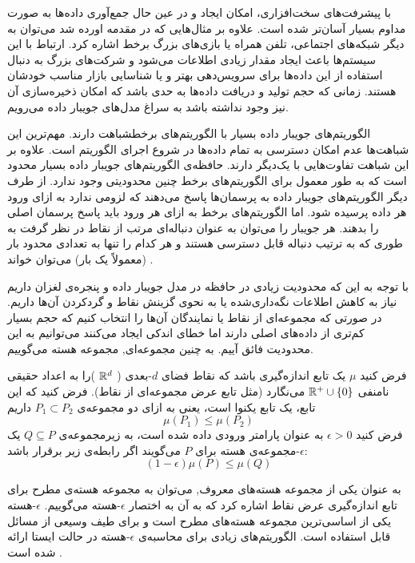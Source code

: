 با پیشرفت‌های سخت‌افزاری، امکان ایجاد و در عین حال جمع‌آوری داده‌ها به صورت مداوم بسیار آسان‌تر شده است. علاوه بر مثال‌هایی که در مقدمه اورده شد می‌توان به دیگر شبکه‌های اجتماعی، تلفن همراه یا بازی‌های بزرگ برخط اشاره کرد. ارتباط با این سیستم‌ها باعث ایجاد مقدار زیادی اطلاعات می‌شود و شرکت‌های بزرگ به دنبال استفاده از این داده‌ها برای سرویس‌دهی بهتر و یا شناسایی بازار مناسب خودشان هستند. زمانی که حجم تولید و دریافت داده‌ها به حدی باشد که امکان ذخیره‌سازی آن نیز وجود نداشته باشد به سراغ مدل‌های جویبار داده می‌رویم.

الگوریتم‌های جویبار داده بسیار با الگوریتم‌های برخطشباهت دارند. مهم‌ترین این شباهت‌ها عدم امکان دسترسی به تمام داده‌ها در شروع اجرای الگوریتم است. علاوه بر این شباهت تفاوت‌هایی با یک‌دیگر دارند. حافظه‌ی الگوریتم‌های جویبار داده بسیار محدود است که به طور معمول برای الگوریتم‌های برخط چنین محدودیتی وجود ندارد. از طرف دیگر الگوریتم‌های جویبار داده به پرسمان‌ها پاسخ می‌دهند که لزومی ندارد به ازای ورود هر داده پرسیده شود. اما الگوریتم‌های برخط به ازای هر ورود باید پاسخ پرسمان اصلی را بدهند.
هر جویبار را می‌توان به عنوان دنباله‌ای مرتب از نقاط در نظر گرفت به طوری که به ترتیب دنباله قابل دسترسی هستند و هر کدام را تنها به تعدادی محدود بار (معمولاً یک بار) می‌توان خواند .

با توجه به این که محدودیت زیادی در حافظه در مدل جویبار داده و پنجره‌ی لغزان داریم نیاز به کاهش اطلاعات نگه‌داری‌شده یا به نحوی گزینش نقاط و گردکردن آن‌ها داریم.
در صورتی که مجموعه‌ای از نقاط یا نمایندگان آن‌ها را انتخاب کنیم که حجم بسیار کم‌تری از داده‌های اصلی دارند اما خطای اندکی ایجاد می‌کنند می‌توانیم به این محدودیت فائق آییم. به چنین مجموعه‌ای, مجموعه هسته می‌گوییم.


فرض کنید $\mu$ یک تابع اندازه‌گیری باشد که نقاط فضای $d$-بعدی ‌( $\mathbb{R}^d$ )را به اعداد حقیقی نامنفی $\mathbb{R}^+ \cup \left\{ 0 \right\}$ می‌نگارد (مثل تابع عرض مجموعه‌ای از نقاط). 
فرض کنید که این تابع، یک تابع یکنوا است، یعنی به ازای دو مجموعه‌ی  $P_1 \subset P_2$ داریم
$$\mu(P_1) \leq \mu(P_2)$$
فرض کنید $\epsilon > 0$ به عنوان پارامتر ورودی داده شده است، به زیرمجموعه‌ی $Q \subseteq P$ یک $\epsilon$-مجموعه‌ی هسته برای $P$ می‌گویند اگر رابطه‌ی زیر برقرار باشد:
$$(1 - \epsilon) \mu(P) \leq \mu (Q)$$


به عنوان یکی از مجموعه هسته‌های معروف, می‌توان به مجموعه هسته‌ی مطرح برای تابع اندازه‌گیری عرض نقاط اشاره کرد که به آن به اختصار $\epsilon$-هسته می‌گوییم.
$\epsilon$-هسته 
یکی از اساسی‌ترین مجموعه هسته‌های مطرح است و برای طیف وسیعی از مسائل قابل استفاده است.
الگوریتم‌های زیادی برای محاسبه‌ی $\epsilon$-هسته در حالت ایستا ارائه شده است . 

